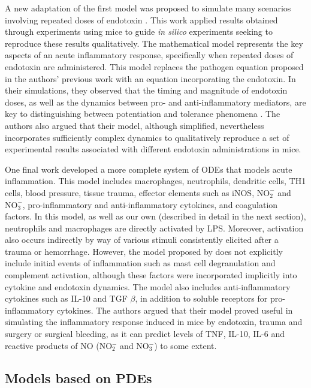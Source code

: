 \documentclass[10pt]{bmc_article}
\newenvironment{bmcformat}{\baselineskip20pt\sloppy\setboolean{publ}{false}}{\baselineskip20pt\sloppy}
\begin{document}
\begin{bmcformat}
A new adaptation of the first model \cite{Kumar2004} was proposed to simulate many scenarios involving repeated doses of 
endotoxin \cite{reynolds2}. This work applied results obtained through experiments using mice to guide \textit{in silico} experiments 
seeking to reproduce these results qualitatively. The mathematical model represents the key aspects of an acute inflammatory response, 
specifically when repeated doses of endotoxin are administered. This model replaces the pathogen equation proposed in the authors' 
previous work \cite{reynolds1} with an equation incorporating the endotoxin. In their simulations, they observed that the timing and 
magnitude of endotoxin doses, as well as the dynamics between pro- and anti-inflammatory mediators, are key to distinguishing between 
potentiation and tolerance phenomena \cite{reynolds2}. The authors also argued that their model, although simplified, nevertheless 
incorporates sufficiently complex dynamics to qualitatively reproduce a set of experimental results associated with different endotoxin 
administrations in mice. 

One final work \cite{Vodovotz2006} developed a more complete system of ODEs that models acute inflammation. This model includes 
macrophages, neutrophils, dendritic cells, TH1 cells, blood pressure, tissue trauma, effector elements such as iNOS, 
$\mathrm{NO_2^-}$ and $\mathrm{NO_3^-}$, pro-inflammatory and anti-inflammatory cytokines, and coagulation factors. In this model, 
as well as our own (described in detail in the next section), 
neutrophils and macrophages are directly activated by LPS. Moreover, activation also occurs indirectly by way of various stimuli 
consistently elicited after a trauma or hemorrhage. However, the model proposed by \cite{Vodovotz2006} does not explicitly include 
initial events of inflammation such as mast cell degranulation and complement activation, although these 
factors were incorporated implicitly into cytokine and endotoxin dynamics. The model also includes anti-inflammatory cytokines such 
as IL-10 and TGF $\beta$, in addition to soluble receptors for pro-inflammatory cytokines. The authors argued that their model proved 
useful in simulating the inflammatory response induced in mice by endotoxin, trauma and surgery or surgical bleeding, as it can predict 
levels of TNF, IL-10, IL-6 and reactive products of NO (NO$_{2}^{-}$ and NO$_{3}^{-}$) to some extent. 

\subsection*{Models based on PDEs}


\end{bmcformat}
\end{document}
